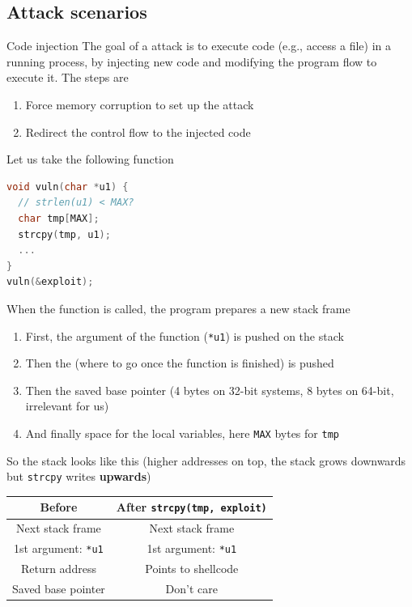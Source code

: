 \subsection{Attack scenarios}
\begin{parag}{Code injection}
    The goal of a  attack is to execute code (e.g., access a file) in a running process, by injecting new code and modifying the program flow to execute it. The steps are
    \begin{enumerate}
        \item Force memory corruption to set up the attack
        \item Redirect the control flow to the injected code
    \end{enumerate}
    Let us take the following function
    \begin{lstlisting}[language=C]
void vuln(char *u1) {
  // strlen(u1) < MAX?
  char tmp[MAX];
  strcpy(tmp, u1);
  ...
}
vuln(&exploit);
    \end{lstlisting}
    When the function is called, the program prepares a new stack frame
    \begin{enumerate}
        \item First, the argument of the function (\texttt{*u1}) is pushed on the stack
        \item Then the  (where to go once the function is finished) is pushed
        \item Then the saved base pointer (4 bytes on 32-bit systems, 8 bytes on 64-bit, irrelevant for us)
        \item And finally space for the local variables, here \texttt{MAX} bytes for \texttt{tmp}
    \end{enumerate}
    So the stack looks like this (higher addresses on top, the stack grows downwards but \texttt{strcpy} writes \textbf{upwards})
    \begin{center}
        \begin{tabular}{|c|c|}
            \hline
            \textbf{Before} & \textbf{After \texttt{strcpy(tmp, exploit)}} \\
            \hline
            Next stack frame & Next stack frame \\
            \hline
            1st argument: \texttt{*u1} & 1st argument: \texttt{*u1} \\
            \hline
            Return address & Points to shellcode \\
            \hline
            Saved base pointer & Don't care \\

\end{tabular}
\end{center}
\end{parag}
